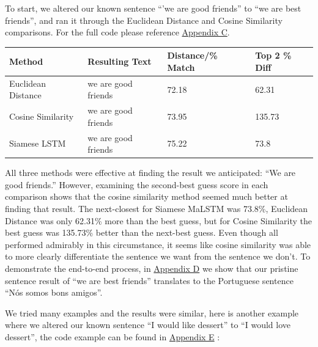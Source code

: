 \documentclass[runningheads]{llncs}
\begin{document}
	To start, we altered our known sentence ``'we are good friends'' to ``we are best friends'', and ran it through the Euclidean Distance and Cosine Similarity comparisons. For the full code please reference \hyperlink{Appendix C}{Appendix C}.

	\begin{table} 
		\begin{center}
			\begin{tabular}{| l | l | l | l |}
			  \hline			
			  Method & Resulting Text & Distance/\% Match & Top 2 \% Diff \\
			  \hline			
			  Euclidean Distance & we are good friends & 72.18 & 62.31 \\
			  \hline			
			  Cosine Similarity & we are good friends & 73.95 & 135.73 \\
			  \hline  
			  Siamese LSTM & we are good friends & 75.22 & 73.8 \\
			  \hline
			\end{tabular}
		\end{center}
		\label{table:``We Are Best Friends'' Match Test}
	\end{table}

	All three methods were effective at finding the result we anticipated: ``We are good friends.'' However, examining the second-best guess score in each comparison shows that the cosine similarity method seemed much better at finding that result. The next-closest for Siamese MaLSTM was 73.8\%, Euclidean Distance was only 62.31\% more than the best guess, but for Cosine Similarity the best guess was 135.73\% better than the next-best guess. Even though all performed admirably in this circumstance, it seems like cosine similarity was able to more clearly differentiate the sentence we want from the sentence we don't.  To demonstrate the end-to-end process, in \hyperlink{Appendix D}{Appendix D} we show that our pristine sentence result of ``we are best friends'' translates to the Portuguese sentence ``Nós somos bons amigos''.

	We tried many examples and the results were similar, here is another example where we altered our known sentence ``I would like dessert'' to ``I would love dessert'', the code example can be found in \hyperlink{Appendix E}{Appendix E} :
\end{document}
